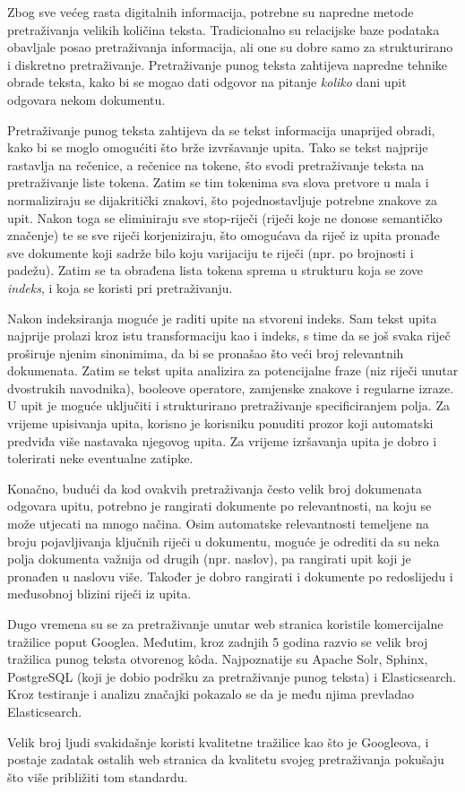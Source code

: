 \documentclass[a4paper,twoside,12pt]{scrreprt}
\begin{document}
\begin{sazetak}
  Zbog sve većeg rasta digitalnih informacija, potrebne su napredne metode pretraživanja velikih količina teksta. Tradicionalno su relacijske baze podataka obavljale posao pretraživanja informacija, ali one su dobre samo za strukturirano i diskretno pretraživanje. Pretraživanje punog teksta zahtijeva napredne tehnike obrade teksta, kako bi se mogao dati odgovor na pitanje \textit{koliko} dani upit odgovara nekom dokumentu.

  Pretraživanje punog teksta zahtijeva da se tekst informacija unaprijed obradi, kako bi se moglo omogućiti što brže izvršavanje upita. Tako se tekst najprije rastavlja na rečenice, a rečenice na tokene, što svodi pretraživanje teksta na pretraživanje liste tokena. Zatim se tim tokenima sva slova pretvore u mala i normaliziraju se dijakritički znakovi, što pojednostavljuje potrebne znakove za upit. Nakon toga se eliminiraju sve stop-riječi (riječi koje ne donose semantičko značenje) te se sve riječi korjeniziraju, što omogućava da riječ iz upita pronađe sve dokumente koji sadrže bilo koju varijaciju te riječi (npr. po brojnosti i padežu). Zatim se ta obrađena lista tokena sprema u strukturu koja se zove \textit{indeks}, i koja se koristi pri pretraživanju.

  Nakon indeksiranja moguće je raditi upite na stvoreni indeks. Sam tekst upita najprije prolazi kroz istu transformaciju kao i indeks, s time da se još svaka riječ proširuje njenim sinonimima, da bi se pronašao što veći broj relevantnih dokumenata. Zatim se tekst upita analizira za potencijalne fraze (niz riječi unutar dvostrukih navodnika), booleove operatore, zamjenske znakove i regularne izraze. U upit je moguće uključiti i strukturirano pretraživanje specificiranjem polja. Za vrijeme upisivanja upita, korisno je korisniku ponuditi prozor koji automatski predviđa više nastavaka njegovog upita. Za vrijeme izršavanja upita je dobro i tolerirati neke eventualne zatipke.

  Konačno, budući da kod ovakvih pretraživanja često velik broj dokumenata odgovara upitu, potrebno je rangirati dokumente po relevantnosti, na koju se može utjecati na mnogo načina. Osim automatske relevantnosti temeljene na broju pojavljivanja ključnih riječi u dokumentu, moguće je odrediti da su neka polja dokumenta važnija od drugih (npr. naslov), pa rangirati upit koji je pronađen u naslovu više. Također je dobro rangirati i dokumente po redoslijedu i međusobnoj blizini riječi iz upita.

  Dugo vremena su se za pretraživanje unutar web stranica koristile komercijalne tražilice poput Googlea. Međutim, kroz zadnjih 5 godina razvio se velik broj tražilica punog teksta otvorenog kôda. Najpoznatije su Apache Solr, Sphinx, PostgreSQL (koji je dobio podršku za pretraživanje punog teksta) i Elasticsearch. Kroz testiranje i analizu značajki pokazalo se da je među njima prevladao Elasticsearch.

  Velik broj ljudi svakidašnje koristi kvalitetne tražilice kao što je Googleova, i postaje zadatak ostalih web stranica da kvalitetu svojeg pretraživanja pokušaju što više približiti tom standardu.
\end{sazetak}
\end{document}
